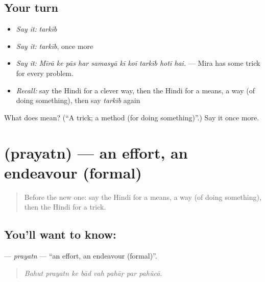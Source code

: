 \subsection*{Your turn}
\begin{itemize}
\raggedright
  \item \emph{Say it:} \emph{tarkīb}
  \item \emph{Say it:} \emph{tarkīb}, once more
  \item \emph{Say it:} \emph{Mīrā ke pās har samasyā kī koī tarkīb hotī hai.} — Mira has some trick for every problem.
  \item \emph{Recall:} say the Hindi for a clever way, then the Hindi for a means, a way (of doing something), then say \emph{tarkīb} again
\end{itemize}

\begin{tcolorbox}[breakable,colback=teal!4,colframe=teal!35!black,title={Before you move on}]
What does  mean? (\textquotedblleft{}A trick; a method (for doing something)\textquotedblright{}.) Say it once more.
\end{tcolorbox}
\section[\texorpdfstring{\hi{प्रयत्न} (prayatn)}{प्रयत्न (prayatn)}]{ (prayatn) — an effort, an endeavour (formal)}

\label{lesson:HI-C540-prayatn}



\begin{quote}
Before the new one: say the Hindi for a means, a way (of doing something), then the Hindi for a trick.
\end{quote}

\subsection*{You'll want to know: }
\textbf{} — \emph{prayatn} — \textquotedblleft{}an effort, an endeavour (formal)\textquotedblright{}.

\begin{quote}
       
\end{quote}

\begin{quote}
\emph{Bahut prayatn ke bād vah pahāṛ par pahũcā.}
\end{quote}

